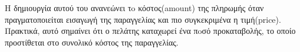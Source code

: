 H δημιουργία αυτού του  ανανεώνει τo κόστος(\foreignlanguage{english}{amount}) της πληρωμής όταν πραγματοποιείται εισαγωγή της παραγγελίας και πιο συγκεκριμένα η τιμή(\foreignlanguage{english}{price}). Πρακτικά, αυτό σημαίνει ότι ο πελάτης καταχωρεί ένα πoσό προκαταβολής, το οποίο προστίθεται στο συνολικό κόστος της παραγγελίας.
\hfill \break